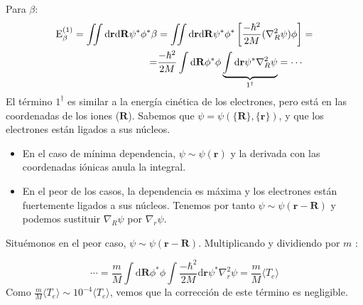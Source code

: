 Para $\beta$:
\begin{equation}
  \begin{split}
    \text E ^{(1)}_{\beta} =\iint \text{d}\mathbf{r} \text{d}\mathbf{R} \psi^* \phi^* \beta &=
    \iint \text{d}\mathbf{r} \text{d}\mathbf{R} \psi^* \phi^* \left[
      \frac{-\hbar^2}{2M}(\nabla^2_R \psi)\phi \right] = \\
    =& \frac{-\hbar^2}{2M} \int \text{d}\mathbf{R}\phi^* \phi
    \underbrace{\int \text{d}\mathbf{r}\psi^* \nabla_R^2 \psi}_{1 ^{\dagger}} = \cdots
  \end{split}
\end{equation}
El término $1 ^{\dagger}$ es similar a la energía cinética de los
electrones, pero está en las coordenadas de los iones
($\mathbf{R}$). Sabemos que
$\psi =\psi(\{\mathbf{R}\},\{\mathbf{r}\})$, y que los electrones
están ligados a sus núcleos.
\begin{itemize}
\item En el caso de mínima dependencia, $\psi \sim \psi(\mathbf{r})$ y
  la derivada con las coordenadas iónicas anula la integral.
\item En el peor de los casos, la dependencia es máxima y los
  electrones están fuertemente ligados a sus núcleos. Tenemos por
  tanto $\psi \sim \psi(\mathbf{r}-\mathbf{R})$ y podemos sustituir
  $\nabla_R \psi$ por $\nabla_r \psi$.
\end{itemize}
Situémonos en el peor caso, $\psi \sim
\psi(\mathbf{r}-\mathbf{R})$. Multiplicando y dividiendo por $m$ :

\begin{equation}
  \cdots = \frac{m}{M} \int \text{d}\mathbf{R} \phi^* \phi \int  
  \frac{-\hbar^2}{2M} \text{d}\mathbf{r} \psi^* \nabla_r^2 \psi =
  \frac{m}{M} \langle T_e \rangle
 \end{equation}
 Como
 $\frac{m}{M} \langle T_e \rangle \sim 10 ^{-4} \langle T_e \rangle$,
 vemos que la corrección de este término es negligible.


